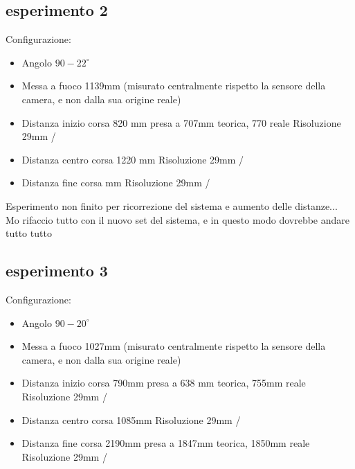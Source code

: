 \subsection{esperimento 2}
Configurazione:
\begin{itemize}
  \item Angolo			 $90-22^\circ$
  \item Messa a fuoco		1139mm (misurato centralmente rispetto la sensore della camera, e non dalla sua origine reale)
  \item Distanza inizio corsa	820 mm presa a 707mm teorica, 770 reale		Risoluzione 29mm / 
  \item Distanza centro corsa	1220 mm		Risoluzione 29mm / 
  \item Distanza fine corsa	 mm		Risoluzione 29mm / 
\end{itemize}
Esperimento non finito per ricorrezione del sistema e aumento delle distanze... Mo rifaccio tutto con il nuovo set del sistema, e in questo modo dovrebbe andare tutto tutto

\subsection{esperimento 3}
Configurazione:
\begin{itemize}
  \item Angolo			 $90-20^\circ$
  \item Messa a fuoco		1027mm (misurato centralmente rispetto la sensore della camera, e non dalla sua origine reale)
  \item Distanza inizio corsa	790mm presa a 638 mm teorica, 755mm reale	Risoluzione 29mm / 
  \item Distanza centro corsa	1085mm						Risoluzione 29mm / 
  \item Distanza fine corsa	2190mm presa a 1847mm teorica, 1850mm reale	Risoluzione 29mm / 
\end{itemize}

